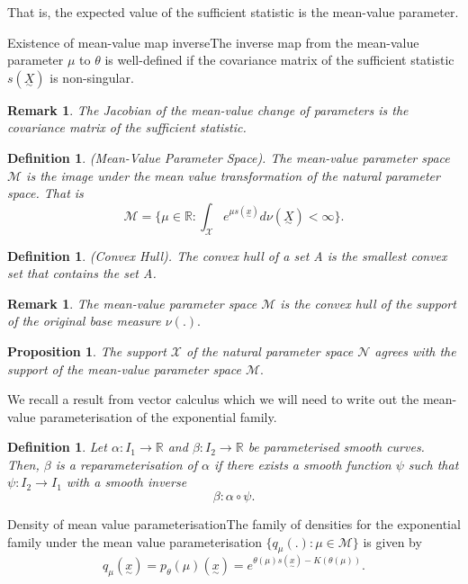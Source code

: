 \documentclass[twoside]{article}
\newtheorem{proposition}[theorem]{Proposition}
\newtheorem{definition}[theorem]{Definition}
\newtheorem{remark}[theorem]{Remark}
\newcommand{\utilde}{\underset{\sim}}
\begin{document}
That is, the expected value of the sufficient statistic is the mean-value parameter.


\begin{theorem_exam}{Existence of mean-value map inverse}{}The inverse map from the mean-value parameter $\mu$ to $\theta$ is well-defined if the covariance matrix of the sufficient statistic $s(\utilde{X})$ is non-singular.
\end{theorem_exam}
\begin{remark}The Jacobian of the mean-value change of parameters is the covariance matrix of the sufficient statistic.
\end{remark}

\begin{definition}(Mean-Value Parameter Space). The mean-value parameter space $\mathcal{M}$ is the image under the mean value transformation of the natural parameter space. That is 
$$
\mathcal{M} = \{\mu \in \mathbb{R}: \int_{\mathcal{X}}e^{\mu s(\utilde{x})}d\nu(\utilde{X}) < \infty\}.
$$
\end{definition}

\begin{definition}(Convex Hull). The convex hull of a set A is the smallest convex set that contains the set A.
\end{definition}

\begin{remark}The mean-value parameter space $\mathcal{M}$ is the convex hull of the support of the original base measure $\nu(.).$
\end{remark}

\begin{proposition}The support $\mathcal{X}$ of the natural parameter space $\mathcal{N}$ agrees with the support of the mean-value parameter space $\mathcal{M}.$
\end{proposition}

We recall a result from vector calculus which we will need to write out the mean-value parameterisation of the exponential family.
\begin{definition}Let $\alpha: I_1 \rightarrow \mathbb{R}$ and $\beta: I_2 \rightarrow \mathbb{R}$ be parameterised smooth curves. Then, $\beta$ is a reparameterisation of $\alpha$ if there exists a smooth function $\psi$ such that $\psi: I_2 \rightarrow I_1$ with a smooth inverse 
$$
\beta: \alpha \circ \psi.
$$
\end{definition}

\begin{definition_exam}{Density of mean value parameterisation}{}The family of densities for the exponential family under the mean value parameterisation $\{q_{\mu}(.): \mu \in \mathcal{M}\}$ is given by 
$$
q_{\mu}(\utilde{x}) = p_{\theta}(\mu)(\utilde{x}) = e^{\theta(\mu)s(\utilde{x}) - K(\theta(\mu))}.
$$
\end{definition_exam}
\end{document}
